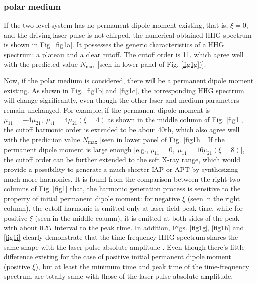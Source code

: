 \documentclass[10pt,letterpaper]{article}
\begin{document}
\subsubsection{polar medium}
If the two-level system has no permanent dipole moment existing, that is, $\xi=0$, and the driving laser pulse is not chirped, the numerical obtained HHG spectrum is shown in Fig. \ref{fig1a}. It possesses the generic characteristics of a HHG spectrum: a plateau and a clear cutoff. The cutoff order is 11, which agree well with the predicted value $N_{\textrm{max}}$ [seen in lower panel of Fig. \ref{fig1g})].

Now, if the polar medium is considered, there will be a permanent dipole moment existing. As shown in Fig. \ref{fig1b} and \ref{fig1c}, the corresponding HHG spectrum will change significantly, even though the other laser and medium parameters remain unchanged. For example, if the permanent dipole moment is $\mu_{11} =-4\mu_{21},\;\mu_{11} =4\mu_{21}(\xi=4)$ as shown in the middle column of Fig. \ref{fig1}, the cutoff harmonic order is extended to be about 40th, which also agree well with the prediction value $N_\textrm{max}$ [seen in lower panel of Fig. \ref{fig1h}]. If the permanent dipole moment is large enough [e.g., $\mu_{11} =0,\;\mu_{11} =16\mu_{21}(\xi=8)$], the cutoff order can be further extended to the soft X-ray range, which would provide a possibility to generate a much shorter IAP or APT by synthesizing much more harmonics. It is found from the comparison between the right two columns of Fig. \ref{fig1} that, the harmonic generation process is sensitive to the property of initial permanent dipole moment: for negative $\xi$ (seen in the right column), the cutoff harmonic is emitted only at laser field peak time, while for positive $\xi$ (seen in the middle column), it is emitted at both sides of the peak with about $0.5T$ interval to the peak time. In addition, Figs. \ref{fig1g}, \ref{fig1h} and \ref{fig1i} clearly demonstrate that the time-frequency HHG spectrum shares the same shape with the laser pulse absolute amplitude \cite{CuiNi2010NJP-wavelet}. Even though there's little difference existing for the case of positive initial permanent dipole moment (positive $\xi$), but at least the minimum time and peak time of the time-frequency spectrum are totally same with those of the laser pulse absolute amplitude.      
\end{document}
